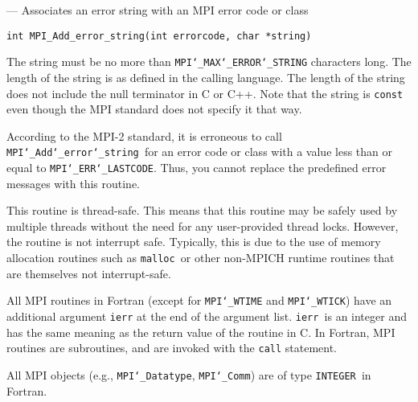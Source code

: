 \startmanpage
{}
--- Associates an error string with an MPI error code or  class 
\startvb\begin{verbatim}
int MPI_Add_error_string(int errorcode, char *string)

\end{verbatim}
\endvb

\par
{}
The string must be no more than {\tt MPI{\tt \char`\_}MAX{\tt \char`\_}ERROR{\tt \char`\_}STRING} characters long.
The length of the string is as defined in the calling language.
The length of the string does not include the null terminator in C or C++.
Note that the string is {\tt const} even though the MPI standard does not
specify it that way.
\par
According to the MPI-2 standard, it is erroneous to call {\tt MPI{\tt \char`\_}Add{\tt \char`\_}error{\tt \char`\_}string
}for an error code or class with a value less than or equal
to {\tt MPI{\tt \char`\_}ERR{\tt \char`\_}LASTCODE}.  Thus, you cannot replace the predefined error messages
with this routine.
\par
{}
\par
This routine is thread-safe.  This means that this routine may be
safely used by multiple threads without the need for any user-provided
thread locks.  However, the routine is not interrupt safe.  Typically,
this is due to the use of memory allocation routines such as {\tt malloc
}or other non-MPICH runtime routines that are themselves not interrupt-safe.
\par
{}
All MPI routines in Fortran (except for {\tt MPI{\tt \char`\_}WTIME} and {\tt MPI{\tt \char`\_}WTICK}) have
an additional argument {\tt ierr} at the end of the argument list.  {\tt ierr
}is an integer and has the same meaning as the return value of the routine
in C.  In Fortran, MPI routines are subroutines, and are invoked with the
{\tt call} statement.
\par
All MPI objects (e.g., {\tt MPI{\tt \char`\_}Datatype}, {\tt MPI{\tt \char`\_}Comm}) are of type {\tt INTEGER
}in Fortran.
\par
{}
\par

